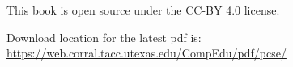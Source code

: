 
This book is open source under the CC-BY 4.0 license.

Download location for the latest pdf is:
\url{https://web.corral.tacc.utexas.edu/CompEdu/pdf/pcse/}

